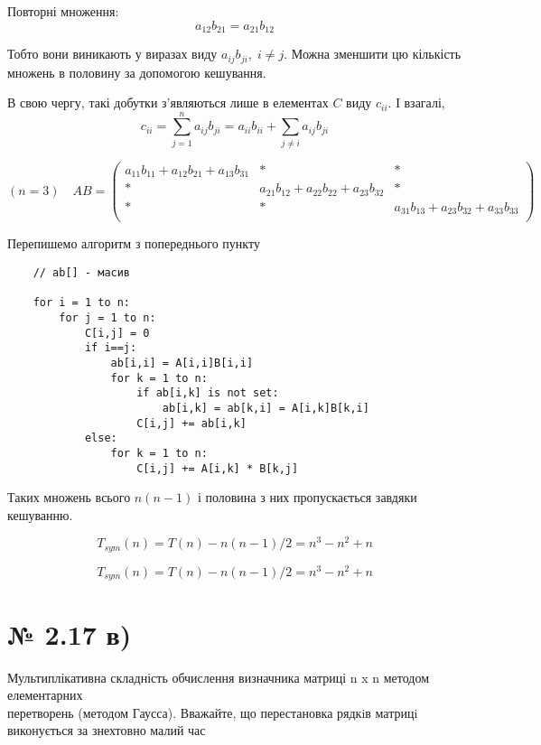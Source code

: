 \documentclass[11pt, a4paper]{article} %
\begin{document}
Повторні множення:
$$a_{12}b_{21} = a_{21}b_{12}$$

Тобто вони виникають у виразах виду $a_{ij}b_{ji},\; i\ne j$.
Можна зменшити цю кількість множень в половину за допомогою кешування.

В свою чергу, такі добутки з'являються лише в елементах $C$ виду $c_{ii}$.
І взагалі,
$$c_{ii} = \sum_{j=1}^n a_{ij}b_{ji} = a_{ii}b_{ii} + \sum_{j\ne i} a_{ij}b_{ji}$$

$$(n=3)\quad AB = \begin{pmatrix}
    a_{11}b_{11}+\boxed{a_{12}b_{21}}+\boxed{a_{13}b_{31}} & * & *\\
    * & \boxed{a_{21}b_{12}} + a_{22}b_{22} + \boxed{a_{23}b_{32}} & *\\
    * & * & \boxed{a_{31}b_{13}} + \boxed{a_{23}b_{32}} + a_{33}b_{33} \\
\end{pmatrix}$$

Перепишемо алгоритм з попереднього пункту
\begin{lstlisting}
    // ab[] - масив

    for i = 1 to n:
        for j = 1 to n:
            C[i,j] = 0 
            if i==j:
                ab[i,i] = A[i,i]B[i,i]
                for k = 1 to n:
                    if ab[i,k] is not set:
                        ab[i,k] = ab[k,i] = A[i,k]B[k,i]
                    C[i,j] += ab[i,k]
            else:
                for k = 1 to n:
                    C[i,j] += A[i,k] * B[k,j]
\end{lstlisting}

Таких множень всього $n(n-1)$ і половина з них пропускається завдяки кешуванню.

$$T_{sym}(n) = T(n) - n(n-1)/2 = n^3 - n^2 + n$$


\begin{mdframed}[style=ans]
    $$T_{sym}(n) = T(n) - n(n-1)/2 = n^3 - n^2 + n$$
\end{mdframed}

\section*{№ 2.17 в)}
\begin{mdframed}
    Мультиплікативна складність обчислення визначника матриці n x n методом елементарних\\ перетворень (методом Гаусса). 
    Вважайте, що перестановка рядкiв матрицi виконується за знехтовно малий час
\end{mdframed}
\end{document}
